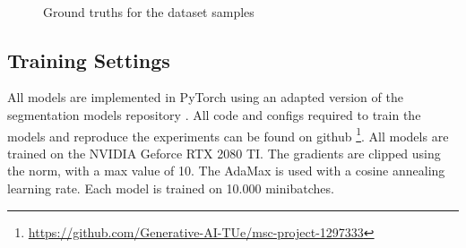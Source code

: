 \begin{figure}
    \centering
    \\
    \caption{\label{fig:coco-samples}Ground truths for the dataset samples}
\end{figure}


\subsection{Training Settings}
All models are implemented in PyTorch \cite{Ansel_PyTorch_2_Faster_2024} using an adapted version of the segmentation models repository \cite{Iakubovskii:2019}. All code and configs required to train the models and reproduce the experiments can be found on github \footnote[1]{\url{https://github.com/Generative-AI-TUe/msc-project-1297333}}. All models are trained on the NVIDIA Geforce RTX 2080 TI. The gradients are clipped using the norm, with a max value of 10. The AdaMax\cite{kingma2017adammethodstochasticoptimization} is used with a cosine annealing learning rate. Each model is trained on 10.000 minibatches.


